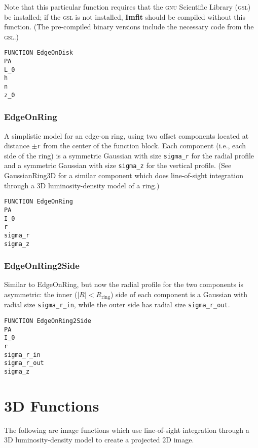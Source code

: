 \documentclass[10pt,a4paper,article]{memoir}
\newcommand{\imfit}{\textbf{Imfit}}
\begin{document}
Note that this particular function requires that the \textsc{gnu} Scientific Library
(\textsc{gsl}) be installed; if the \textsc{gsl} is not installed, \imfit{} should be compiled
without this function. (The pre-compiled binary versions include the necessary
code from the \textsc{gsl}.)

\begin{verbatim}
FUNCTION EdgeOnDisk
PA
L_0
h
n
z_0
\end{verbatim}


\subsubsection{EdgeOnRing}

A simplistic model for an edge-on ring, using two offset components located
at distance $\pm$\texttt{r} from the center of the function block. Each component
(i.e., each side of the ring) is a symmetric Gaussian with size
\texttt{sigma\_r} for the radial profile and a symmetric Gaussian with
size \texttt{sigma\_z} for the vertical profile. (See GaussianRing3D for a similar
component which does line-of-sight integration through a 3D luminosity-density
model of a ring.)

\begin{verbatim}
FUNCTION EdgeOnRing
PA
I_0
r
sigma_r
sigma_z
\end{verbatim}


\subsubsection{EdgeOnRing2Side}

Similar to EdgeOnRing, but now the radial profile for the two components is
asymmetric: the inner ($|R| < R_{\mathrm{ring}}$) side of each component is a Gaussian
with radial size \texttt{sigma\_r\_in}, while the outer side has radial size
\texttt{sigma\_r\_out}.

\begin{verbatim}
FUNCTION EdgeOnRing2Side
PA
I_0
r
sigma_r_in
sigma_r_out
sigma_z
\end{verbatim}


\section{3D Functions}

The following are image functions which use line-of-sight
integration through a 3D luminosity-density model to create a projected 2D
image.
\end{document}
